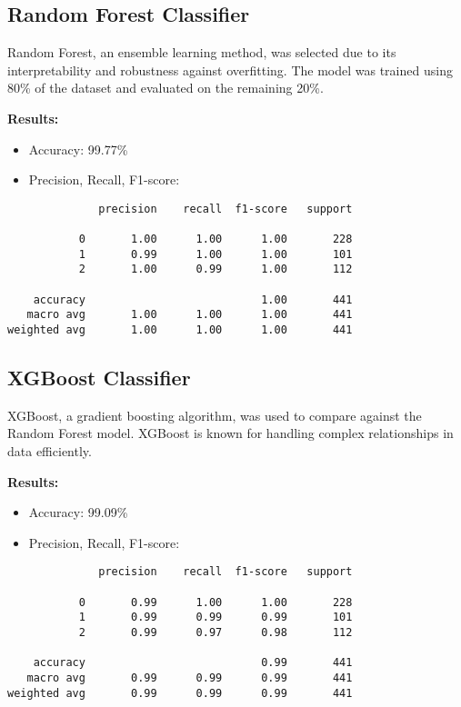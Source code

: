 \documentclass[sigconf]{acmart}
\begin{document}
\subsection{Random Forest Classifier}
Random Forest, an ensemble learning method, was selected due to its interpretability and robustness against overfitting. The model was trained using 80\% of the dataset and evaluated on the remaining 20\%.

\textbf{Results:}
\begin{itemize}
    \item Accuracy: 99.77\%
    \item Precision, Recall, F1-score:
\end{itemize}
\begin{verbatim}
              precision    recall  f1-score   support

           0       1.00      1.00      1.00       228
           1       0.99      1.00      1.00       101
           2       1.00      0.99      1.00       112

    accuracy                           1.00       441
   macro avg       1.00      1.00      1.00       441
weighted avg       1.00      1.00      1.00       441
\end{verbatim}

\subsection{XGBoost Classifier}
XGBoost, a gradient boosting algorithm, was used to compare against the Random Forest model. XGBoost is known for handling complex relationships in data efficiently.

\textbf{Results:}
\begin{itemize}
    \item Accuracy: 99.09\%
    \item Precision, Recall, F1-score:
\end{itemize}
\begin{verbatim}
              precision    recall  f1-score   support

           0       0.99      1.00      1.00       228
           1       0.99      0.99      0.99       101
           2       0.99      0.97      0.98       112

    accuracy                           0.99       441
   macro avg       0.99      0.99      0.99       441
weighted avg       0.99      0.99      0.99       441
\end{verbatim}
\end{document}
